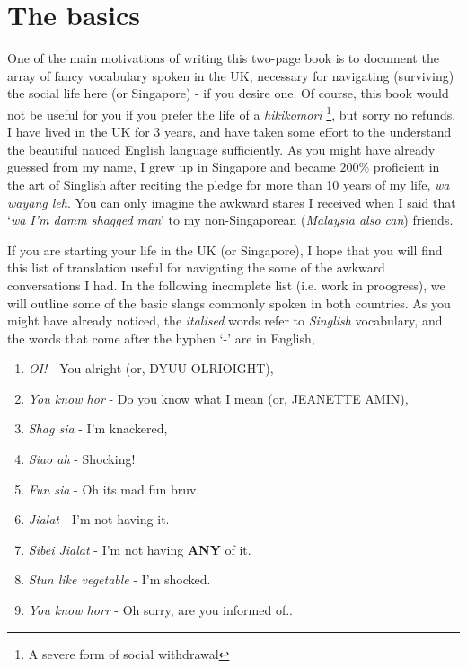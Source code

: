 \documentclass[11pt, a4paper]{report}
\begin{document}

\chapter{The basics}
One of the main motivations of writing this two-page book is to document the array of fancy vocabulary spoken in the UK, necessary for navigating (surviving) the social life here (or Singapore) - if you desire one.
Of course, this book would not be useful for you if you prefer the life of a \textit{hikikomori} \footnote{A severe form of social withdrawal}, but sorry no refunds.
I have lived in the UK for 3 years, and have taken some effort to the understand the beautiful nauced English language sufficiently.
As you might have already guessed from my name, I grew up in Singapore and became $200\%$ proficient in the art of Singlish after reciting the pledge for more than 10 years of my life, \textit{wa wayang leh}.
You can only imagine the awkward stares I received when I said that `\emph{wa I'm damm shagged man}' to my non-Singaporean (\textit{Malaysia also can}) friends.

If you are starting your life in the UK (or Singapore), I hope that you will find this list of translation useful for navigating the some of the awkward conversations I had.
In the following incomplete list (i.e. work in proogress), we will outline some of the basic slangs commonly spoken in both countries.
As you might have already noticed, the \textit{italised} words refer to \textit{Singlish} vocabulary, and the words that come after the hyphen `-' are in English,

\begin{enumerate}
    \item \textit{OI!} - You alright (or, DYUU OLRIOIGHT),
    \item \textit{You know hor} - Do you know what I mean (or, JEANETTE AMIN),
    \item \textit{Shag sia} - I'm knackered,
    \item \textit{Siao ah} - Shocking!
    \item \textit{Fun sia} - Oh its mad fun bruv,
    \item \textit{Jialat} - I'm not having it.
    \item \textit{Sibei Jialat} - I'm not having \textbf{ANY} of it.
    \item \textit{Stun like vegetable} - I'm shocked.
    \item \textit{You know horr} - Oh sorry, are you informed of.. 
\end{enumerate}
\end{document}
